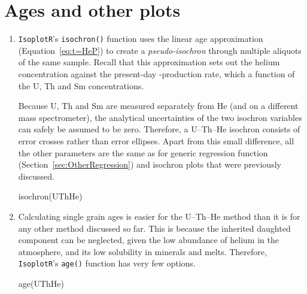 \begin{refsection}
\begin{enumerate}
\end{enumerate}

\section{Ages and other plots}

\begin{enumerate}
  
\item \texttt{IsoplotR}'s \texttt{isochron()} function uses the linear age
approximation (Equation~\ref{eq:t=HeP}) to create a
\textit{pseudo-isochron} through multiple aliquots of the same sample.
Recall that this approximation sets out the helium concentration
against the present-day \textalpha-production rate, which a function
of the U, Th and Sm concentrations.

Because U, Th and Sm are measured separately from He (and on a
different mass spectrometer), the analytical uncertainties of the two
isochron variables can safely be assumed to be zero. Therefore, a
U--Th--He isochron consists of error crosses rather than error
ellipses.  Apart from this small difference, all the other parameters
are the same as for generic regression function
(Section~\ref{sec:OtherRegression}) and isochron plots that were
previously discussed.

\begin{console}
isochron(UThHe)
\end{console}

\item Calculating single grain ages is easier for the U--Th--He method than
it is for any other method discussed so far. This is because the
inherited daughted component can be neglected, given the low abundance
of helium in the atmosphere, and its low solubility in minerals and
melts. Therefore, \texttt{IsoplotR}'s \texttt{age()} function has very
few options.

\begin{console}
age(UThHe)
\end{console}


\end{enumerate}
\end{refsection}
